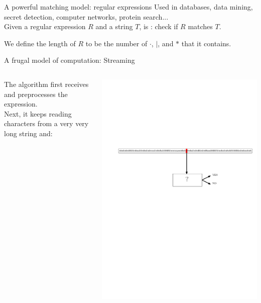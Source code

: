 \begin{frame}{A powerful matching model: regular expressions}
    \bigskip
    Used in databases, \pause data mining, \pause secret detection, \pause computer networks, \pause protein search\pause ...\\
    \pause
    \bigskip
    {
        Given a regular expression $R$ and a string $T$,  is : check if $R$ matches $T$.\\
    }
    
    
    \pause
    \medskip
    We define the length of $R$ to be the number of $\cdot$, $|$, and $\ast$ that it contains.
\end{frame}

\begin{frame}{A frugal model of computation: Streaming}
\begin{columns}
    The algorithm first receives and preprocesses the expression.\\ Next, it keeps reading characters from a very very long string and:
    \begin{center}
        \includegraphics[width=\textwidth]{pictures/stream3}
    \end{center}
\end{columns}


\end{frame}
